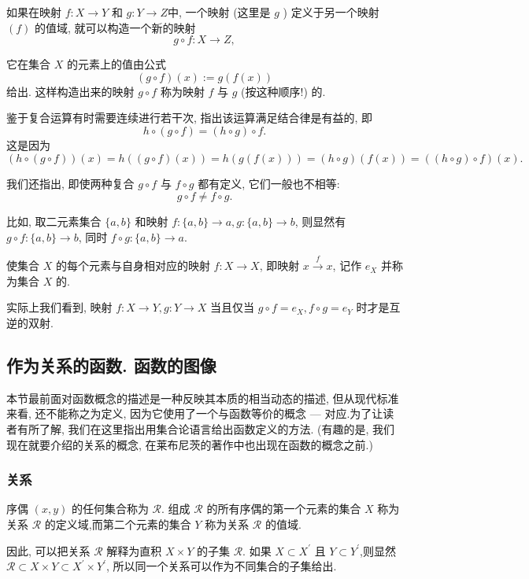 \documentclass{ctexart}
\begin{document}
如果在映射 $f: X \rightarrow Y$ 和 $g: Y \rightarrow Z$中, 一个映射 (这里是 $g$ ) 定义于另一个映射 $(f)$ 的值域, 就可以构造一个新的映射
$$
g \circ f: X \rightarrow Z,
$$

它在集合 $X$ 的元素上的值由公式
$$
(g \circ f)(x):=g(f(x))
$$
给出. 这样构造出来的映射 $g \circ f$ 称为映射 $f$ 与 $g$ (按这种顺序!) 的.

鉴于复合运算有时需要连续进行若干次, 指出该运算满足结合律是有益的, 即
$$
h \circ(g \circ f)=(h \circ g) \circ f .
$$
这是因为
\[
    (h \circ(g \circ f))(x)=h((g \circ f)(x))=h(g(f(x)))=(h \circ g)(f(x))=((h \circ g) \circ f)(x).
\]

我们还指出, 即使两种复合 $g \circ f$ 与 $f \circ g$ 都有定义, 它们一般也不相等:
$$
g \circ f \neq f \circ g .
$$

比如, 取二元素集合 $\{a, b\}$ 和映射 $f:\{a, b\} \rightarrow a, g:\{a, b\} \rightarrow b$, 则显然有 $g \circ f:\{a, b\} \rightarrow b$, 同时 $f \circ g:\{a, b\} \rightarrow a$.

使集合 $X$ 的每个元素与自身相对应的映射 $f: X \rightarrow X$, 即映射 $x \stackrel{f}{\longrightarrow} x$, 记作 $e_X$ 并称为集合 $X$ 的.

实际上我们看到, 映射 $f: X \rightarrow Y, g: Y \rightarrow X$ 当且仅当 $g \circ f=e_X, f \circ g=e_Y$ 时才是互逆的双射. 

\subsection{作为关系的函数. 函数的图像} 本节最前面对函数概念的描述是一种反映其本质的相当动态的描述, 但从现代标准来看, 还不能称之为定义, 因为它使用了一个与函数等价的概念 --- 对应.为了让读者有所了解, 我们在这里指出用集合论语言给出函数定义的方法. (有趣的是, 我们现在就要介绍的关系的概念, 在莱布尼茨的著作中也出现在函数的概念之前.)

\subsubsection{关系} 

序偶 $(x, y)$ 的任何集合称为 $\mathcal{R}$. 组成 $\mathcal{R}$ 的所有序偶的第一个元素的集合 $X$ 称为关系 $\mathcal{R}$ 的定义域,而第二个元素的集合 $Y$ 称为关系 $\mathcal{R}$ 的值域.

因此, 可以把关系 $\mathcal{R}$ 解释为直积 $X \times Y$ 的子集 $\mathcal{R}$. 如果 $X \subset X^{\prime}$ 且 $Y \subset Y^{\prime}$,则显然 $\mathcal{R} \subset X \times Y \subset X^{\prime} \times Y^{\prime}$, 所以同一个关系可以作为不同集合的子集给出.
\end{document}

